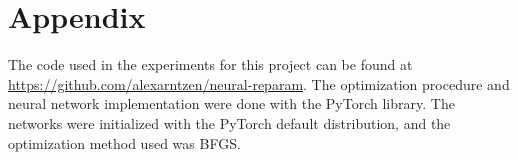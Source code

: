 \appendix
\section{Appendix}
\label{sec:appendix}
The code used in the experiments for this project can be found at \url{https://github.com/alexarntzen/neural-reparam}. The optimization procedure and neural network implementation were done with the PyTorch \cite{PyTorch} library. The networks were initialized with the PyTorch default distribution, and the optimization method used was BFGS. 
